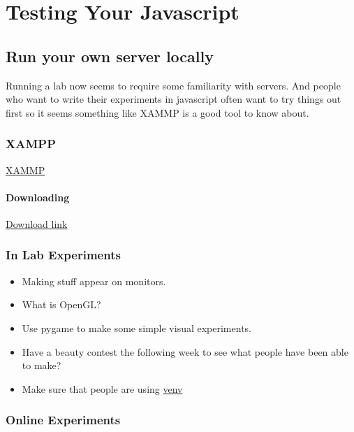 \documentclass[
  letterpaper,
  DIV=11,
  numbers=noendperiod]{scrreprt}
\providecommand{\tightlist}{%
  \setlength{\itemsep}{0pt}\setlength{\parskip}{0pt}}\usepackage{longtable,booktabs,array}
\begin{document}

\chapter{Testing Your Javascript}\label{testing-your-javascript}

\section{Run your own server locally}\label{run-your-own-server-locally}

Running a lab now seems to require some familiarity with servers. And
people who want to write their experiments in javascript often want to
try things out first so it seems something like XAMMP is a good tool to
know about.

\subsection{XAMPP}\label{xampp}

\href{https://www.apachefriends.org/index.html}{XAMMP}

\subsubsection{Downloading}\label{downloading}

\href{https://www.apachefriends.org/download.html}{Download link}

\subsection{In Lab Experiments}\label{in-lab-experiments-1}

\begin{itemize}
\tightlist
\item
  Making stuff appear on monitors.
\item
  What is OpenGL?
\item
  Use pygame to make some simple visual experiments.
\item
  Have a beauty contest the following week to see what people have been
  able to make?
\item
  Make sure that people are using
  \href{https://python.land/virtual-environments/virtualenv}{venv}
\end{itemize}

\subsection{Online Experiments}\label{online-experiments-1}
\end{document}
